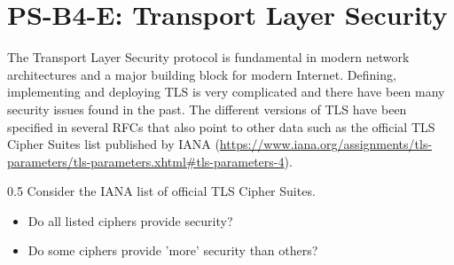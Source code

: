 \documentclass[]{scrartcl}
\newcounter{exercise}
\newcounter{qid}[section]
\newcommand{\exerciseprefix}{prefix}
\newcommand{\questiontitle}{Questions}
\newcommand{\blockid}{B4}
\newcommand{\exname}{}
\begin{document}
\pagebreak
{}
\renewcommand{\exname}{TLS}
\section*{PS-\blockid{}-E\theexercise: Transport Layer Security}
The Transport Layer Security protocol is fundamental in modern network architectures and a major building block for modern Internet. Defining, implementing and deploying TLS is very complicated and there have been many security issues found in the past. The different versions of TLS have been specified in several RFCs that also point to other data such as the official TLS Cipher Suites list published by IANA (\url{https://www.iana.org/assignments/tls-parameters/tls-parameters.xhtml#tls-parameters-4}).


\renewcommand{\exerciseprefix}{PS-\blockid{}-E\theexercise: \exname{}-Q\theqid}
\renewcommand{\questiontitle}{\exerciseprefix{}: TLS Cipher Suites}
\begin{exercisebox}{0.5}
Consider the IANA list of official TLS Cipher Suites. 
\begin{itemize}
    \item Do all listed ciphers provide security?
    \item Do some ciphers provide 'more' security than others?
    \end{itemize}
\end{exercisebox}
\end{document}
